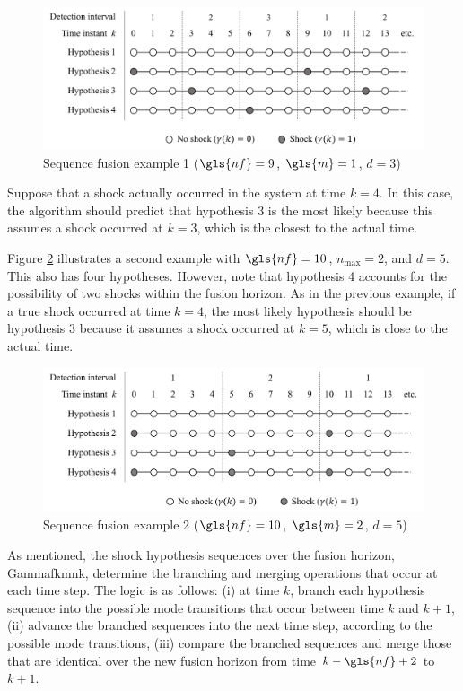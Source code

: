 \begin{figure}[ht]
	\centering
	\includegraphics[width=13.5cm]{images/mm_obs_seq_rob1.pdf}
	\caption{Sequence fusion example 1 ($\gls{nf}=9$, $\gls{m}=1$, $d=3$)}
	\label{fig:mm-obs-seq-SFex1}
\end{figure}

Suppose that a shock actually occurred in the system at time $k=4$. In this case, the algorithm should predict that hypothesis 3 is the most likely because this assumes a shock occurred at $k=3$, which is the closest to the actual time.

Figure \ref{fig:mm-obs-seq-SFex2} illustrates a second example with $\gls{nf}=10$, $n_\text{max}=2$, and $d=5$. This also has four hypotheses. However, note that hypothesis 4 accounts for the possibility of two shocks within the fusion horizon. As in the previous example, if a true shock occurred at time $k=4$, the most likely hypothesis should be hypothesis 3 because it assumes a shock occurred at $k=5$, which is close to the actual time.

\begin{figure}[ht]
	\centering
	\includegraphics[width=13.5cm]{images/mm_obs_seq_rob2.pdf}
	\caption{Sequence fusion example 2 ($\gls{nf}=10$, $\gls{m}=2$, $d=5$)}
	\label{fig:mm-obs-seq-SFex2}
\end{figure}

As mentioned, the shock hypothesis sequences over the fusion horizon, \gls{Gammafkmnk}, determine the branching and merging operations that occur at each time step. The logic is as follows: (i) at time $k$, branch each hypothesis sequence into the possible mode transitions that occur between time $k$ and $k+1$, (ii) advance the branched sequences into the next time step, according to the possible mode transitions, (iii) compare the branched sequences and merge those that are identical over the new fusion horizon from time $k-\gls{nf}+2$ to $k+1$.

